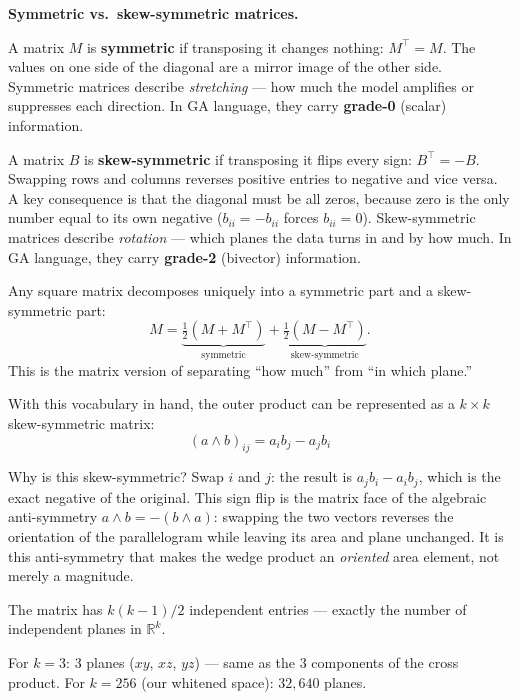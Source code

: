 \documentclass[11pt, twoside, openright]{memoir}
\newcommand{\op}{\wedge}          %
\numberwithin{equation}{chapter}
\begin{document}
\begin{mathbox}
\textbf{Symmetric vs.\ skew-symmetric matrices.}

A matrix $M$ is \textbf{symmetric} if transposing it changes nothing:
$M^\top = M$.  The values on one side of the diagonal are a mirror
image of the other side.  Symmetric matrices describe
\emph{stretching} --- how much the model amplifies or suppresses
each direction.  In GA language, they carry \textbf{grade-0}
(scalar) information.

A matrix $B$ is \textbf{skew-symmetric} if transposing it flips every
sign: $B^\top = -B$.  Swapping rows and columns reverses positive
entries to negative and vice versa.  A key consequence is that the
diagonal must be all zeros, because zero is the only number equal to
its own negative ($b_{ii} = -b_{ii}$ forces $b_{ii} = 0$).
Skew-symmetric matrices describe \emph{rotation} --- which planes the
data turns in and by how much.  In GA language, they carry
\textbf{grade-2} (bivector) information.

Any square matrix decomposes uniquely into a symmetric part and a
skew-symmetric part:
\begin{equation}
\label{eq:sym-skew-decomp}
  M = \underbrace{\tfrac{1}{2}(M + M^\top)}_{\text{symmetric}}
    + \underbrace{\tfrac{1}{2}(M - M^\top)}_{\text{skew-symmetric}}.
\end{equation}
This is the matrix version of separating ``how much'' from
``in which plane.''
\end{mathbox}

With this vocabulary in hand, the outer product can be represented as a
$k \times k$ skew-symmetric matrix:
\begin{equation}
\label{eq:wedge-matrix}
  (a \op b)_{ij} = a_i b_j - a_j b_i
\end{equation}

Why is this skew-symmetric?  Swap $i$ and $j$: the result is
$a_j b_i - a_i b_j$, which is the exact negative of the original.
This sign flip is the matrix face of the algebraic anti-symmetry
$a \op b = -(b \op a)$: swapping the two vectors reverses the
orientation of the parallelogram while leaving its area and plane
unchanged.  It is this anti-symmetry that makes the wedge product an
\emph{oriented} area element, not merely a magnitude.

The matrix has $k(k-1)/2$ independent entries --- exactly the number of
independent planes in $\mathbb{R}^k$.

For $k = 3$: 3 planes ($xy$, $xz$, $yz$) --- same as the 3 components
of the cross product.  For $k = 256$ (our whitened space): $32{,}640$
planes.
\end{document}
